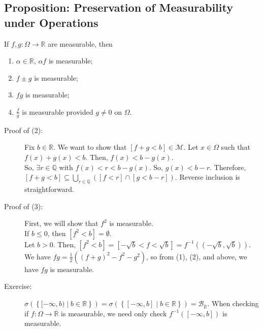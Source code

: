 \documentclass[9pt]{extarticle}
\newcommand{\Q}{\mathbb{Q}}
\newcommand{\R}{\mathbb{R}}
\begin{document}
  \subsection{Proposition: Preservation of Measurability under Operations}%
  If $f,g: \Omega \rightarrow \R$ are measurable, then
  \begin{enumerate}[(1)]
    \item $\alpha \in \R$, $\alpha f$ is measurable;
    \item $f\pm g$ is measurable;
    \item $fg$ is measurable;
    \item $\frac{f}{g}$ is measurable provided $g\neq 0$ on $\Omega$.
  \end{enumerate}
  \begin{description}
    \item[Proof of (2):] Fix $b\in \R$. We want to show that $[f+g < b]\in \mathcal{M}$. Let $x\in \Omega$ such that $f(x) + g(x) < b$. Then, $f(x) < b-g(x)$.\\

      So, $\exists r\in\Q$ with $f(x) < r < b-g(x)$. So, $g(x) < b - r$. Therefore, $[f + g < b] \subseteq \bigcup_{r\in \Q}\left([f < r]\cap [g < b - r]\right)$. Reverse inclusion is straightforward.
    \item[Proof of (3):] First, we will show that $f^{2}$ is measurable.\\

      If $b \leq 0$, then $[f^2 < b] = \emptyset$.\\

      Let $b > 0$. Then, $[f^2 < b] = [-\sqrt{b} < f < \sqrt{b}] = f^{-1}\left((-\sqrt{b},\sqrt{b})\right)$.\\

      We have $fg = \frac{1}{2}\left((f+g)^2 - f^2 - g^2\right)$, so from (1), (2), and above, we have $fg$ is measurable.
    \item[Exercise:] $\sigma\left(\left\{[-\infty,b)\mid b\in\R\right\}\right) = \sigma\left(\left\{[-\infty,b]\mid b\in\R\right\}\right) = \mathcal{B}_{\overline{\R}}$. When checking if $f: \Omega \rightarrow \overline{\R}$ is measurable, we need only check $f^{-1}([-\infty,b])$ is measurable.
  \end{description}
\end{document}
